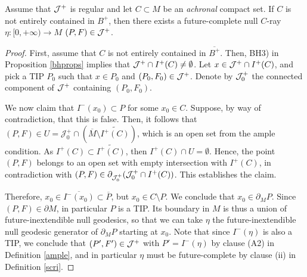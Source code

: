 \begin{theorem}
\label{main}
Assume that ${\cal J}^+$ is regular and let $C \subset M$ be an {\em achronal} compact set. If $C$ is not entirely contained in $B^+$, then there exists a future-complete null $C$-ray $\eta: [0,+\infty) \rightarrow M$  $(P,F) \in {\cal J}^+$.
\end{theorem}
\begin{proof}
First, assume that $C$ is not entirely contained in $\overline{B^+}$. Then, BH3) in Proposition \ref{bhprops} implies that ${\cal J}^+\cap I^+ (C)\neq \emptyset$. Let $x \in {\cal J}^+\cap I^+ (C)$, and pick a TIP $P_0$ such that $x \in P_0$ and $(P_0,F_0)\in {\cal J}^+$. Denote by ${\cal J}^+_0$ the connected component of ${\cal J}^+$ containing $(P_0,F_0)$.


We now claim that $I^{-}(x_0)\subset P$ for some $x_0\in C$. Suppose, by way of contradiction, that this is false. Then, it follows that $(P,F)\in U=\mathcal{J}_{0}^{+}\cap\left(\overline{M}\setminus\widetilde{I^{+}(C)}\right)$, which is an open set from the ample condition. As $I^{+}(C)\subset \widetilde{I^{+}(C)}$, then $I^{+}(C)\cap U=\emptyset$. Hence, the point $(P,F)$ belongs to an open set with empty intersection with $I^{+}(C)$, in contradiction with $(P,F)\in\partial_{{\cal J}^+_0}(\mathcal{J}^+_{0}\cap I^+ (C))$. This establishes the claim.

Therefore, $x_0 \in \overline{I^{-}(x_0)}\subset \overline{P}$, but $x_0\in C\setminus P$. We conclude that $x_0 \in\partial_{M} P$. Since $(P,F) \in \partial M$, in particular $P$ is a TIP. Its boundary in $M$ is thus a union of future-inextendible null geodesics, so that we can take $\eta$ the future-inextendible null geodesic generator of $\partial_{M} P$ starting at $x_0$. Note that since $I^-(\eta)$ is also a TIP, we conclude that $(P',F') \in {\cal J}^+$ with $P'=I^-(\eta)$ by clause (A2) in Definition \ref{ample}, and in particular $\eta$ must be future-complete by clause (ii) in Definition \ref{scri}.


\end{proof}
